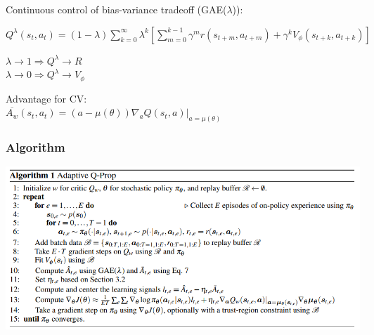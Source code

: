 \documentclass{beamer}
\begin{document}
\begin{frame}


Continuous control of bias-variance tradeoff (GAE($\lambda$)):\\

{
\setlength{\parindent}{1cm}
\hangindent=1cm
\vspace{3mm}
$Q^\lambda (s_t,a_t) = (1-\lambda) \sum_{k=0}^{\infty} \lambda^k \left[ \sum_{m=0}^{k-1} \gamma^m r(s_{t+m}, a_{t+m}) + \gamma^{k} V_\phi  (s_{t+k}, a_{t+k}) \right]$

\vspace{1.5mm}
$\lambda \rightarrow 1 \Rightarrow Q^\lambda \rightarrow R$\\
$\lambda \rightarrow 0 \Rightarrow Q^\lambda \rightarrow V_\phi$\\
}

\vspace{4mm}
Advantage for CV:\\
{
\vspace{3mm}
\setlength{\parindent}{1cm}
\hangindent=1cm
$\overline{A_w} (s_t,a_t) = (a - \mu(\theta) )\nabla_a Q(s_t,a)|_{a=\mu(\theta)}$
}

\end{frame}

\begin{frame}[t]
\frametitle{Algorithm}
\includegraphics[scale=0.35]{q-prop-algo}
\end{frame}
\end{document}
